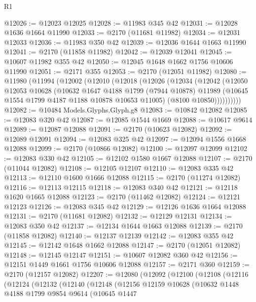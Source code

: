\begin{lexlean}{R1}
\begin{coremodule}
@12026 := @12023 @12025
@12028 := @11983 @345 @42
@12031 := @12028 @1636 @1664 @11990
@12033 := @2170 (@11681 @11982)
@12034 := @12031 @12033
@12036 := @11983 @350 @42
@12039 := @12036 @1644 @1663 @11990
@12041 := @2170 (@11858 @11982)
@12042 := @12039 @12041
@12045 := @10607 @11982 @355 @42
@12050 := @12045 @1648 @1662 @1756 @10606 @11990
@12051 := @2171 @355
@12053 := @2170 (@12051 @11982)
@12080 := @11980
    (@11994
      (@12002
        (@12010
          (@12018
            (@12026
              (@12034
                (@12042
                  (@12050
                    @12053
                    @10628
                    (@10632
                      @1647
                      @4188
                      @1799
                      (@7944 @10878)
                      @11989
                      (@10645 @1554 @1799 @4187 @1188 @10878 @10653 @11005)
                      (@8100 @10850))))))))))
@12082 := @10484 Models.Glyphs.Glyph.g8
@12083 := @10842 @12082
@12085 := @12083 @320 @42
@12087 := @12085 @1544 @1669
@12088 := @10617 @9614
@12089 := @12087 @12088
@12091 := @2170 (@10623 @12082)
@12092 := @12089 @12091
@12094 := @12083 @325 @42
@12097 := @12094 @1556 @1668 @12088
@12099 := @2170 (@10866 @12082)
@12100 := @12097 @12099
@12102 := @12083 @330 @42
@12105 := @12102 @1580 @1667 @12088
@12107 := @2170 (@11044 @12082)
@12108 := @12105 @12107
@12110 := @12083 @335 @42
@12113 := @12110 @1600 @1666 @12088
@12115 := @2170 (@11274 @12082)
@12116 := @12113 @12115
@12118 := @12083 @340 @42
@12121 := @12118 @1620 @1665 @12088
@12123 := @2170 (@11462 @12082)
@12124 := @12121 @12123
@12126 := @12083 @345 @42
@12129 := @12126 @1636 @1664 @12088
@12131 := @2170 (@11681 @12082)
@12132 := @12129 @12131
@12134 := @12083 @350 @42
@12137 := @12134 @1644 @1663 @12088
@12139 := @2170 (@11858 @12082)
@12140 := @12137 @12139
@12142 := @12083 @355 @42
@12145 := @12142 @1648 @1662 @12088
@12147 := @2170 (@12051 @12082)
@12148 := @12145 @12147
@12151 := @10607 @12082 @360 @42
@12156 := @12151 @1449 @1661 @1756 @10606 @12088
@12157 := @2171 @360
@12159 := @2170 (@12157 @12082)
@12207 := @12080
    (@12092
      (@12100
        (@12108
          (@12116
            (@12124
              (@12132
                (@12140
                  (@12148
                    (@12156
                      @12159
                      @10628
                      (@10632
                        @1448
                        @4188
                        @1799
                        @9854
                        @9614
                        (@10645
                          @1447

\end{coremodule}
\end{lexlean}

